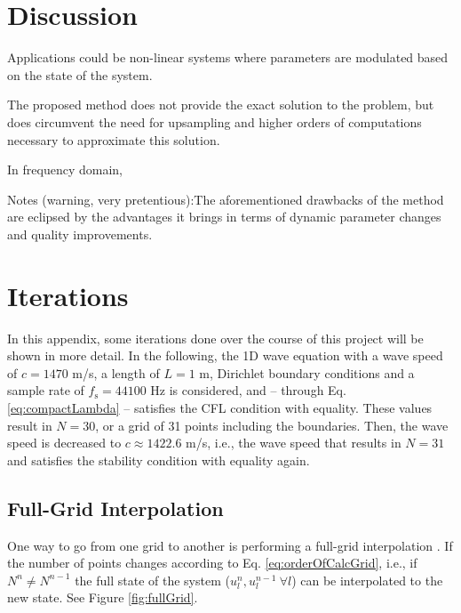 \documentclass[dvipsnames, reprint]{JASA}
\def\SWcomment[#1]{\textcolor{Bittersweet}{#1}}
\begin{document}
\section{Discussion}
Applications could be non-linear systems where parameters are modulated based on the state of the system. 

The proposed method does not provide the exact solution to the problem, but does circumvent the need for upsampling and higher orders of computations necessary to approximate this solution. 

In frequency domain,

\SWcomment[Notes (warning, very pretentious):]The aforementioned drawbacks of the method are eclipsed by the advantages it brings in terms of dynamic parameter changes and quality improvements. 

\appendix
\section{Iterations}\label{app:A}
In this appendix, some iterations done over the course of this project will be shown in more detail. In the following, the 1D wave equation with a wave speed of $c = 1470$ m/s, a length of $L = 1$ m, Dirichlet boundary conditions and a sample rate of $f_\text{s} = 44100$ Hz is considered, and -- through Eq. \eqref{eq:compactLambda} -- satisfies the CFL condition with equality. These values result in $N = 30$, or a grid of 31 points including the boundaries. Then, the wave speed is decreased to $c \approx 1422.6$ m/s, i.e., the wave speed that results in $N=31$ and satisfies the stability condition with equality again. 

\subsection{Full-Grid Interpolation}
One way to go from one grid to another is performing a full-grid interpolation \cite[Chap. 5]{bilbao2009}. If the number of points changes according to Eq. \eqref{eq:orderOfCalcGrid}, i.e., if $N^n \neq N^{n-1}$ the full state of the system ($u_l^n, u_l^{n-1}\ \forall l$)  can be interpolated to the new state. See Figure \ref{fig:fullGrid}. 
\end{document}
